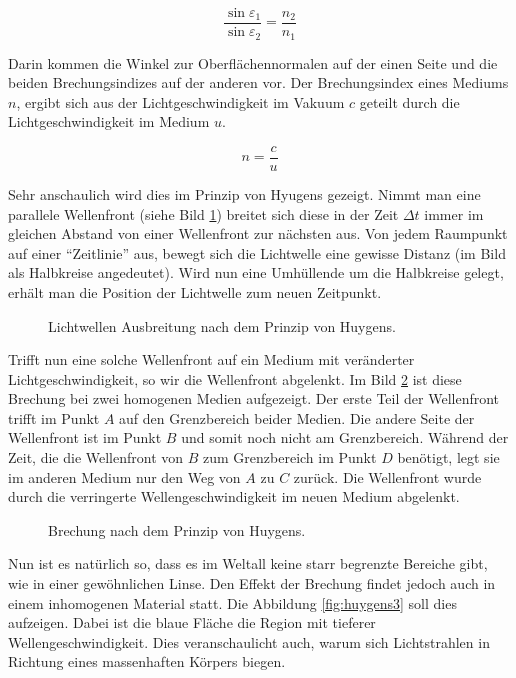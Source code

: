 \begin{refsection}
\begin{equation}
  \frac{\sin \varepsilon_1}{\sin \varepsilon_2} = \frac{n_2}{n_1}
\end{equation}

Darin kommen die Winkel zur Oberflächennormalen auf der einen Seite
und die beiden Brechungsindizes auf der anderen vor.  Der
Brechungsindex eines Mediums \(n\), ergibt sich aus der
Lichtgeschwindigkeit im Vakuum \(c\) geteilt durch die
Lichtgeschwindigkeit im Medium \(u\).

\begin{equation}
  n = \frac{c}{u}
\end{equation}

Sehr anschaulich wird dies im Prinzip von Hyugens gezeigt.  Nimmt man
eine parallele Wellenfront (siehe Bild \ref{fig:huygens1}) breitet
sich diese in der Zeit \(\Delta t\) immer im gleichen Abstand von
einer Wellenfront zur nächsten aus.  Von jedem Raumpunkt auf einer
``Zeitlinie'' aus, bewegt sich die Lichtwelle eine gewisse Distanz (im
Bild als Halbkreise angedeutet).  Wird nun eine Umhüllende um die
Halbkreise gelegt, erhält man die Position der Lichtwelle zum neuen
Zeitpunkt.

\begin{figure}
  \centering
  
  \caption{Lichtwellen Ausbreitung nach dem Prinzip von Huygens.}
  \label{fig:huygens1}
\end{figure}

Trifft nun eine solche Wellenfront auf ein Medium mit veränderter
Lichtgeschwindigkeit, so wir die Wellenfront abgelenkt.  Im Bild
\ref{fig:huygens2} ist diese Brechung bei zwei homogenen Medien
aufgezeigt.  Der erste Teil der Wellenfront trifft im Punkt \(A\) auf
den Grenzbereich beider Medien.  Die andere Seite der Wellenfront ist
im Punkt \(B\) und somit noch nicht am Grenzbereich.  Während der
Zeit, die die Wellenfront von \(B\) zum Grenzbereich im Punkt \(D\)
benötigt, legt sie im anderen Medium nur den Weg von \(A\) zu \(C\)
zurück.  Die Wellenfront wurde durch die verringerte
Wellengeschwindigkeit im neuen Medium abgelenkt.

\begin{figure}
  \centering
  
  \caption{Brechung nach dem Prinzip von Huygens.}
  \label{fig:huygens2}
\end{figure}

Nun ist es natürlich so, dass es im Weltall keine starr begrenzte
Bereiche gibt, wie in einer gewöhnlichen Linse.  Den Effekt der
Brechung findet jedoch auch in einem inhomogenen Material statt.  Die
Abbildung \ref{fig:huygens3} soll dies aufzeigen.  Dabei ist die blaue
Fläche die Region mit tieferer Wellengeschwindigkeit.  Dies
veranschaulicht auch, warum sich Lichtstrahlen in Richtung eines
massenhaften Körpers biegen.


\end{refsection}
